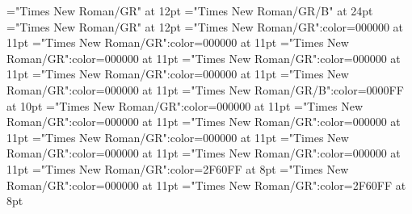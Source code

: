 \documentclass[a4paper]{article}
\begin{document}
\pagestyle{plain}
\sloppy
\setlength{\parfillskip}{0pt plus 1fil}
\font{}="Times New Roman/GR" at 12pt
\font{}="Times New Roman/GR/B" at 24pt
\font{}="Times New Roman/GR" at 12pt
\font\entryletDatadicBody="Times New Roman/GR":color=000000 at 11pt
\font\pictureRightentryletDatadicBody="Times New Roman/GR":color=000000 at 11pt
\font\picturepictureRightentryletDatadicBody="Times New Roman/GR":color=000000 at 11pt
\font\pictureCaptionpictureRightentryletDatadicBody="Times New Roman/GR":color=000000 at 11pt
\font\CmPicturepublishStemCaptionSenseNumberpictureCaptionpictureRightentryletDatadicBody="Times New Roman/GR":color=000000 at 11pt
\font\CmPicturepublishStemCaptionCaptionPubptpictureCaptionpictureRightentryletDatadicBody="Times New Roman/GR":color=000000 at 11pt
\font\headwordsehentryletDatadicBody="Times New Roman/GR/B":color=0000FF at 10pt
\font\sensesentryletDatadicBody="Times New Roman/GR":color=000000 at 11pt
\font\sensesensesentryletDatadicBody="Times New Roman/GR":color=000000 at 11pt
\font\grammaticalinfosensesensesentryletDatadicBody="Times New Roman/GR":color=000000 at 11pt
\font\partofspeechptgrammaticalinfosensesensesentryletDatadicBody="Times New Roman/GR":color=000000 at 11pt
\font{}="Times New Roman/GR":color=000000 at 11pt
\font\xitemptdefinitionLcptsensesensesentryletDatadicBody="Times New Roman/GR":color=000000 at 11pt
\font\xlanguagetagenxitemptdefinitionLcptsensesensesentryletDatadicBody="Times New Roman/GR":color=2F60FF at 8pt
\font\xitemendefinitionLcptsensesensesentryletDatadicBody="Times New Roman/GR":color=000000 at 11pt
\font\xlanguagetagenxitemendefinitionLcptsensesensesentryletDatadicBody="Times New Roman/GR":color=2F60FF at 8pt
\end{document}
